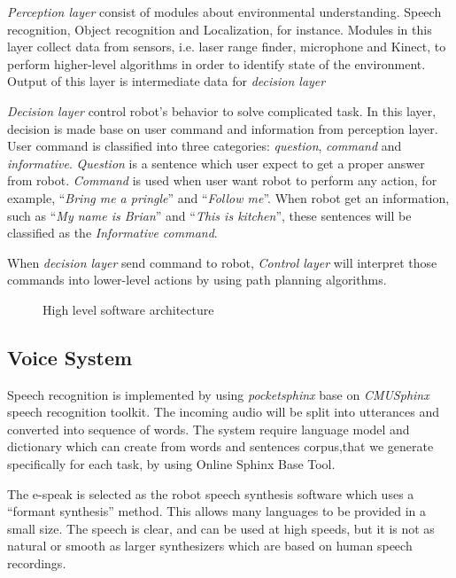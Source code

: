 \documentclass{llncs}
\newcommand{\dq}[1]{``#1''}
\begin{document}
\textit{Perception layer} consist of modules about environmental understanding. Speech recognition, Object recognition and Localization, for instance. Modules in this layer collect data from sensors, i.e. laser range finder, microphone and Kinect, to perform higher-level algorithms in order to identify state of the environment. Output of this layer is intermediate data for \textit{decision layer}

\textit{Decision layer} control robot's behavior to solve complicated task. In this layer, decision is made base on user command and information from perception layer. User command is classified into three categories: \textit{question}, \textit{command} and \textit{informative}. \textit{Question} is a sentence which user expect to get a proper answer from robot. \textit{Command} is used when user want robot to perform any action, for example, \dq{\textit{Bring me a pringle}} and \dq{\textit{Follow me}}. When robot get an information, such as \dq{\textit{My name is Brian}} and \dq{\textit{This is kitchen}}, these sentences will be classified as the \textit{Informative command}.

When \textit{decision layer} send command to robot, \textit{Control layer} will interpret those commands into lower-level actions by using path planning algorithms.

\begin{figure}
\centering
\caption{High level software architecture}
\label{fig:soft_arc}
\end{figure}

\subsection{Voice System}

Speech recognition is implemented by using \textit{pocketsphinx} base on \textit{CMUSphinx} speech recognition toolkit. The incoming audio will be split into utterances and converted into sequence of words. The system require language model and dictionary which can create from words and sentences corpus,that we generate specifically for each task, by using Online Sphinx Base Tool.

The e-speak is selected as the robot speech synthesis software which uses a \dq{formant synthesis} method. This allows many languages to be provided in a small size. The speech is clear, and can be used at high speeds, but it is not as natural or smooth as larger synthesizers which are based on human speech recordings.
\end{document}
